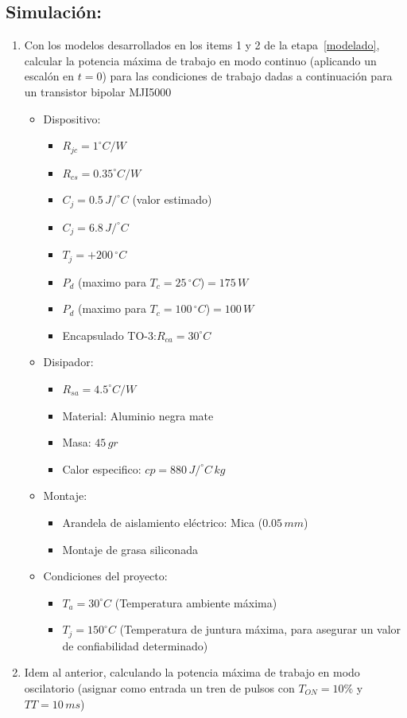 \subsection{Simulación:}
\begin{enumerate}
   \item Con los modelos desarrollados en los items 1 y 2 de la etapa~\ref{modelado}, calcular la potencia máxima de trabajo en modo continuo (aplicando un escalón en $t=0$) para las condiciones de trabajo dadas a continuación para un
      transistor bipolar MJI5000
      \begin{itemize}
         \item Dispositivo:
            \begin{itemize}
               \item $R_{jc}=1^{\circ}C/W$
               \item $R_{cs}=0.35^{\circ}C/W$
               \item $C_{j}=0.5\,J/^{\circ}C$ (valor estimado)
               \item $C_{j}=6.8\,J/^{\circ}C$
               \item $T_{j}=+200\,^{\circ}C$
               \item $P_{d}$ (maximo para $T_{c}=25\,^{\circ}C$)$=175\,W$
               \item $P_{d}$ (maximo para $T_{c}=100\,^{\circ}C$)$=100\,W$
               \item Encapsulado TO-3:$R_{ca}=30^{\circ}C$
            \end{itemize}
         \item Disipador:
            \begin{itemize}
               \item $R_{sa}=4.5^{\circ}C/W$
               \item Material: Aluminio negra mate
               \item Masa: $45\,gr$
               \item Calor especifico: $cp=880\,J/^{\circ}C\,kg$
            \end{itemize}
         \item Montaje:
            \begin{itemize}
               \item Arandela de aislamiento eléctrico: Mica ($0.05\,mm$)
               \item Montaje de grasa siliconada
            \end{itemize}
         \item Condiciones del proyecto:
            \begin{itemize}
               \item $T_{a}=30^{\circ}C$ (Temperatura ambiente máxima)
               \item $T_{j}=150^{\circ}C$ (Temperatura de juntura máxima, para asegurar un valor de confiabilidad determinado)
            \end{itemize}
      \end{itemize}
   \item Idem al anterior, calculando la potencia máxima de trabajo en modo oscilatorio (asignar como entrada un tren de pulsos con $T_{ON}=10\%$ y $TT=10\,ms$)
\end{enumerate}

